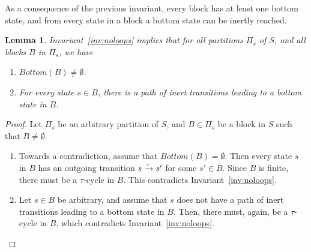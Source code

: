 \documentclass[a4paper,10pt]{article}
\theoremstyle{definition}
\newtheorem{invariant}[definition]{Invariant}
\theoremstyle{plain}
\newtheorem{lemma}[definition]{Lemma}
\newcommand{\pijl}[1]{\mathrel{\text{$\xrightarrow{\smash[t]{#1}}$}}}
\newcommand{\TB}{T_{B\pijl{}}}
\newcommand{\TBaB}{T_{B\pijl{a} B'}}
\newcommand{\TaB}{T_{\pijl{a} B'}}
\newcommand{\Bottom}{\mathit{Bottom}}
\newcommand{\splittableBlocks}{\mathit{splittableBlocks}}
\begin{document}
As a consequence of the previous invariant, every block has at least one bottom state, and from every
state in a block a bottom state can be inertly reached.
\begin{lemma}
\label{lem::noloop}
Invariant~\ref{inv:noloops} implies that for all partitions $\Pi_s$ of $S$, and all blocks $B$ in $\Pi_s$, we have
\begin{enumerate}
	\item $\Bottom(B) \neq \emptyset$.
	\item For every state $s \in B$, there is a path of inert transitions leading to a bottom state in $B$.
\end{enumerate}
\end{lemma}
\begin{proof}
Let $\Pi_s$ be an arbitrary partition of $S$, and $B \in \Pi_s$ be a block in $S$ such that $B \neq \emptyset$.
\begin{enumerate}
	\item	Towards a contradiction, assume that $\Bottom(B) = \emptyset$.
		Then every state $s$ in $B$ has an outgoing transition $s \pijl{\tau} s'$ for some $s' \in B$.
		Since $B$ is finite, there must be a $\tau$-cycle in $B$.
		This contradicts Invariant~\ref{inv:noloops}.
	\item	Let $s \in B$ be arbitrary, and assume that $s$ does not have a path of inert transitions leading to a bottom state in $B$.
		Then, there must, again, be a $\tau$-cycle in $B$, which contradicts Invariant~\ref{inv:noloops}.
		\qedhere
\end{enumerate}
\end{proof}

%
%
%
%
%

\end{document}
